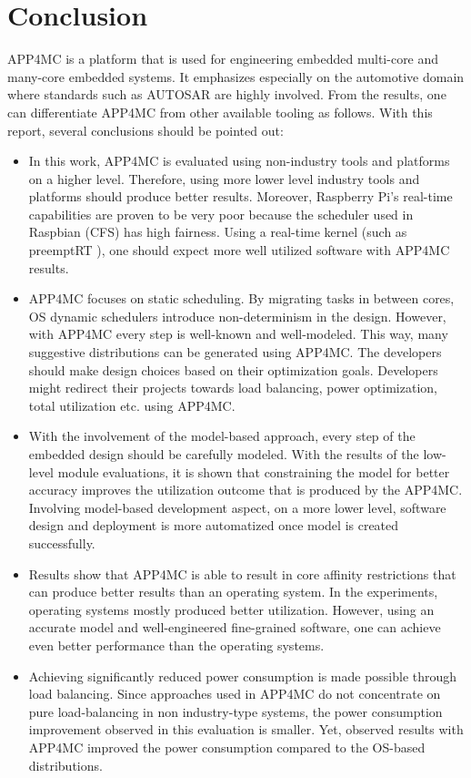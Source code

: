 \chapter{Conclusion} \label{conclusionchapter}
APP4MC is a platform that is used for engineering embedded multi-core and many-core embedded systems. It emphasizes especially on the automotive domain where standards such as AUTOSAR are highly involved. From the results, one can differentiate APP4MC from other available tooling as follows. With this report, several conclusions should be pointed out:
\begin{itemize}
	\item In this work, APP4MC is evaluated using non-industry tools and platforms on a higher level. Therefore, using more lower level industry tools and platforms should produce better results. Moreover, Raspberry Pi's real-time capabilities are proven to be very poor because the scheduler used in Raspbian (CFS) has high fairness. Using a real-time kernel (such as preemptRT \cite{preemptRT}), one should expect more well utilized software with APP4MC results.
	\item APP4MC focuses on static scheduling. By migrating tasks in between cores, OS dynamic schedulers introduce non-determinism in the design. However, with APP4MC every step is well-known and well-modeled. This way, many suggestive distributions can be generated using APP4MC. The developers should make design choices based on their optimization goals. Developers might redirect their projects towards load balancing, power optimization, total utilization etc. using APP4MC.
	\item With the involvement of the model-based approach, every step of the embedded design should be carefully modeled. With the results of the low-level module evaluations, it is shown that constraining the model for better accuracy improves the utilization outcome that is produced by the APP4MC. Involving model-based development aspect, on a more lower level, software design and deployment is more automatized once model is created successfully.
	\item Results show that APP4MC is able to result in core affinity restrictions that can produce better results than an operating system. In the experiments, operating systems mostly produced better utilization. However, using an accurate model and well-engineered fine-grained software, one can achieve even better performance than the operating systems.
	\item Achieving significantly reduced power consumption is made possible through load balancing. Since approaches used in APP4MC do not concentrate on pure load-balancing in non industry-type systems, the power consumption improvement observed in this evaluation is smaller. Yet, observed results with APP4MC improved the power consumption compared to the OS-based distributions. 

\end{itemize}
